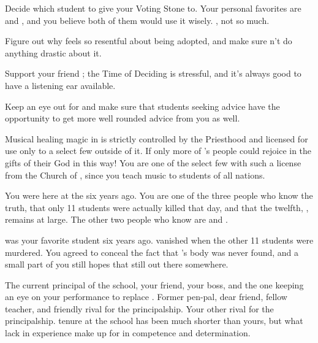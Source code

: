 \documentclass[char]{GL2020}
\begin{document}
\begin{itemz}
    \item Decide which student to give your Voting Stone to. Your personal favorites are \cAdopted{} and \cDisney{}, and you believe both of them would use it wisely. \cLibAssist{}, not so much.
    \item Figure out why \cAdopted{} feels so resentful about being adopted, and make sure \cAdopted{\theydo}n't do anything drastic about it.
    \item Support your friend \cInterpol{}; the Time of Deciding is stressful, and it’s always good to have a listening ear available.
    \item Keep an eye out for \cEthics{} and make sure that students seeking \cEthics{\their} advice have the opportunity to get more well rounded advice from you as well.
\end{itemz}

\begin{itemz}[Notes]
    \item Musical healing magic in \pFarm{} is strictly controlled by the Priesthood and licensed for use only to a select few outside of it. If only more of \cFarmGod{}'s people could rejoice in the gifts of their God in this way! You are one of the select few with such a license from the Church of \cFarmGod{}, since you teach music to students of all nations.
    \item You were here at the \pSchool{} six years ago. You are one of the three people who know the truth, that only 11 students were actually killed that day, and that the twelfth, \cKidScientist{\full}, remains at large. The other two people who know are \cDiplomat{\full} and \cPrincipal{\full}.
    \item \cKidScientist{\full} was your favorite student six years ago. \cKidScientist{\They} vanished when the other 11 students were murdered. You agreed to conceal the fact that \cKidScientist{}'s body was never found, and a small part of you still hopes that \cKidScientist{\theyare} still out there somewhere.
\end{itemz}

\begin{contacts}
    \contact{\cPrincipal{}} The current principal of the school, your friend, your boss, and the one keeping an eye on your performance to replace \cPrincipal{\them}.
    \contact{\cBeetle{}} Former pen-pal, dear friend, fellow teacher, and friendly rival for the principalship.
    \contact{\cChupSecond{}} Your other rival for the principalship. \cChupSecond{\Their} tenure at the school has been much shorter than yours, but what \cChupSecond{\they} lack in experience \cChupSecond{\they} make up for in competence and determination.
\end{contacts}
\end{document}
